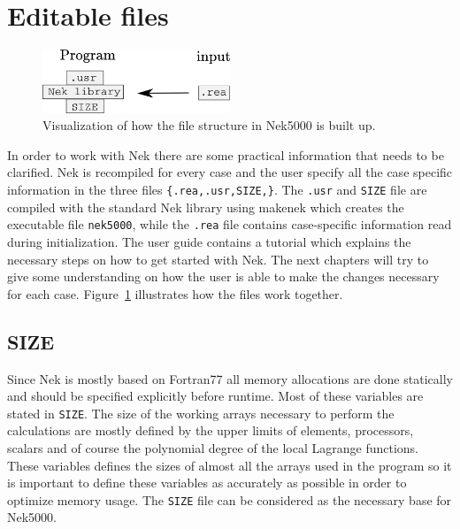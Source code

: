 \section{Editable files}
%
\begin{figure}[h]
	\centering
	\includegraphics[width=0.5\textwidth]{Figures/filestructure2.png}
	\caption{Visualization of how the file structure in Nek5000 is built up.}
	\label{fig:files}
\end{figure}
%
In order to work with Nek there are some practical information that needs to be clarified.
Nek is recompiled for every case and the user specify all the case specific 
information in the three files \verb|{.rea,.usr,SIZE,}|. The \verb|.usr| and \verb|SIZE| file are 
compiled with the standard Nek library using makenek which creates the executable file \verb|nek5000|,
while the \verb|.rea| file contains case-specific information read during initialization.
The user guide \cite{Nek} contains a tutorial which explains the necessary 
steps on how to get started with Nek. The next chapters will try to give some understanding on 
how the user is able to make the changes necessary for each case. Figure~\ref{fig:files} illustrates 
how the files work together. 
%
\subsection{SIZE}
Since Nek is mostly based on Fortran77 all memory allocations are done statically and should be specified explicitly 
before runtime. Most of these variables are stated in \verb|SIZE|. The size of the working arrays 
necessary to perform the calculations are mostly defined by the upper limits of elements, 
processors, scalars and of course the polynomial degree
of the local Lagrange functions. These variables defines the sizes of almost all 
the arrays used in the program so it is important to define these variables as accurately 
as possible in order to optimize memory usage. The \verb|SIZE| file can be considered as the necessary base 
for Nek5000.
